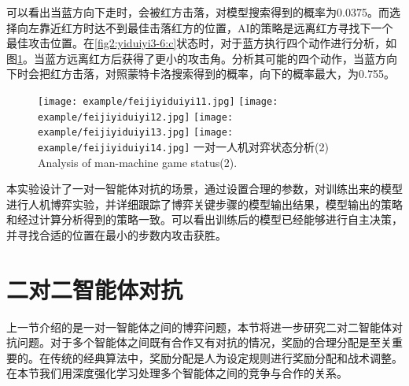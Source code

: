 可以看出当蓝方向下走时，会被红方击落，对模型搜索得到的概率为0.0375。而选择向左靠近红方时达不到最佳击落红方的位置，AI的策略是远离红方寻找下一个最佳攻击位置。在\ref{fig2:yiduiyi3-6:c}状态时，对于蓝方执行四个动作进行分析，如图\ref{fig2:yiduiyi11-14}。当蓝方远离红方后获得了更小的攻击角。分析其可能的四个动作，当蓝方向下时会把红方击落，对照蒙特卡洛搜索得到的概率，向下的概率最大，为0.755。

\begin{figure}[htpb]
	\centering
	{\texttt{[image: example/feijiyiduiyi11.jpg]}}
	\hspace{0.5em}
	{\texttt{[image: example/feijiyiduiyi12.jpg]}}
	\newline
	\centering
	{\texttt{[image: example/feijiyiduiyi13.jpg]}}
	\hspace{0.5em}
	{\texttt{[image: example/feijiyiduiyi14.jpg]}}
	\bicaption
	{一对一人机对弈状态分析(2)}
	{Analysis of man-machine game status(2).}
	\label{fig2:yiduiyi11-14}
\end{figure}


本实验设计了一对一智能体对抗的场景，通过设置合理的参数，对训练出来的模型进行人机博弈实验，并详细跟踪了博弈关键步骤的模型输出结果，模型输出的策略和经过计算分析得到的策略一致。可以看出训练后的模型已经能够进行自主决策，并寻找合适的位置在最小的步数内攻击获胜。

\section{二对二智能体对抗}
上一节介绍的是一对一智能体之间的博弈问题，本节将进一步研究二对二智能体对抗问题。对于多个智能体之间既有合作又有对抗的情况，奖励的合理分配是至关重要的。在传统的经典算法中，奖励分配是人为设定规则进行奖励分配和战术调整。在本节我们用深度强化学习处理多个智能体之间的竞争与合作的关系。

